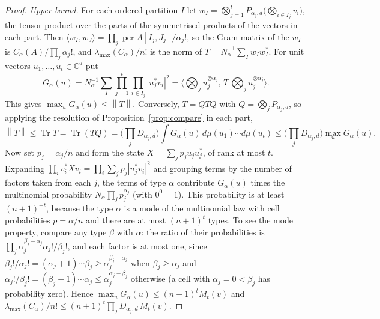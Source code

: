 \documentclass[11pt,a4paper]{article}
\theoremstyle{remark}
\newcommand{\per}{\operatorname{per}}
\newcommand{\tr}{\operatorname{Tr}}
\newcommand{\norm}[1]{\left\lVert#1\right\rVert}
\newcommand{\C}{\mathbb C}
\begin{document}
\begin{proof}
\emph{Upper bound.} For each ordered partition $I$ let $w_I=\bigotimes_{j=1}^tP_{\alpha_j,d}\big(\bigotimes_{i\in I_j}v_i\big)$, the tensor product over the parts of the symmetrised products of the vectors in each part. Then $\langle w_I,w_J\rangle=\prod_j\per A[I_j,J_j]/\alpha_j!$, so the Gram matrix of the $w_I$ is $C_\alpha(A)/\prod_j\alpha_j!$, and $\lambda_{\max}(C_\alpha)/n!$ is the norm of $T=N_\alpha^{-1}\sum_Iw_Iw_I^*$. For unit vectors $u_1,\dots,u_t\in\C^d$ put
\[
 G_\alpha(u)=N_\alpha^{-1}\sum_I\prod_{j=1}^t\prod_{i\in I_j}|u_j^*v_i|^2=\Big\langle\textstyle\bigotimes_ju_j^{\otimes\alpha_j},\,T\,\bigotimes_ju_j^{\otimes\alpha_j}\Big\rangle .
\]
This gives $\max_uG_\alpha(u)\le\norm T$. Conversely, $T=QTQ$ with $Q=\bigotimes_jP_{\alpha_j,d}$, so applying the resolution of Proposition~\ref{prop:compare} in each part,
\[
 \norm T\le\tr T=\tr(TQ)=\Big(\prod_jD_{\alpha_j,d}\Big)\int G_\alpha(u)\,d\mu(u_1)\cdots d\mu(u_t)\le\Big(\prod_jD_{\alpha_j,d}\Big)\max_uG_\alpha(u).
\]
Now set $p_j=\alpha_j/n$ and form the state $X=\sum_jp_ju_ju_j^*$, of rank at most $t$. Expanding $\prod_iv_i^*Xv_i=\prod_i\sum_jp_j|u_j^*v_i|^2$ and grouping terms by the number of factors taken from each $j$, the terms of type $\alpha$ contribute $G_\alpha(u)$ times the multinomial probability $N_\alpha\prod_jp_j^{\alpha_j}$ (with $0^0=1$). This probability is at least $(n+1)^{-t}$, because the type $\alpha$ is a mode of the multinomial law with cell probabilities $p=\alpha/n$ and there are at most $(n+1)^t$ types. To see the mode property, compare any type $\beta$ with $\alpha$: the ratio of their probabilities is $\prod_j\alpha_j^{\beta_j-\alpha_j}\alpha_j!/\beta_j!$, and each factor is at most one, since $\beta_j!/\alpha_j!=(\alpha_j+1)\cdots\beta_j\ge\alpha_j^{\beta_j-\alpha_j}$ when $\beta_j\ge\alpha_j$ and $\alpha_j!/\beta_j!=(\beta_j+1)\cdots\alpha_j\le\alpha_j^{\alpha_j-\beta_j}$ otherwise (a cell with $\alpha_j=0<\beta_j$ has probability zero). Hence $\max_uG_\alpha(u)\le(n+1)^tM_t(v)$ and $\lambda_{\max}(C_\alpha)/n!\le(n+1)^t\prod_jD_{\alpha_j,d}\,M_t(v)$.


\end{proof}
\end{document}
